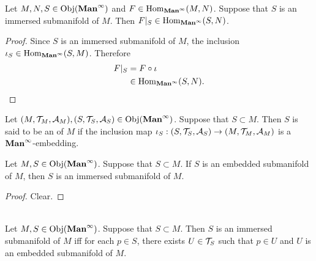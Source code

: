 \documentclass{book}
\begin{document}
\begin{ex} 
	Let $M, N, S \in \operatorname{Obj}(\operatorname*{\text{\textbf{Man}}^{\infty}})$ and $F \in \operatorname{Hom}_{\operatorname*{\text{\textbf{Man}}^{\infty}}}(M, N)$. Suppose that $S$ is an immersed submanifold of $M$. Then $F|_S \in \operatorname{Hom}_{\operatorname*{\text{\textbf{Man}}^{\infty}}}(S, N)$.   
\end{ex}

\begin{proof} 
	Since $S$ is an immersed submanifold of $M$, the inclusion $\iota_S \in \operatorname{Hom}_{\operatorname*{\text{\textbf{Man}}^{\infty}}}(S, M)$. Therefore
	\begin{align*}
		F|_S
		& = F \circ \iota \\
		& \in \operatorname{Hom}_{\operatorname*{\text{\textbf{Man}}^{\infty}}}(S, N).
	\end{align*}
\end{proof}

	\begin{defn} 
		Let $(M, \mathcal{T}_M, \mathcal{A}_M), (S, \mathcal{T}_S, \mathcal{A}_S) \in \operatorname{Obj}(\operatorname*{\text{\textbf{Man}}^{\infty}})$. Suppose that $S \subset M$. Then $S$ is said to be an  of $M$ if the inclusion map $\iota_S:(S, \mathcal{T}_S, \mathcal{A}_S) \rightarrow (M, \mathcal{T}_M, \mathcal{A}_M)$ is a $\operatorname*{\text{\textbf{Man}}^{\infty}}$-embedding.
	\end{defn}

	\begin{ex} 
		Let $M, S \in \operatorname{Obj}(\operatorname*{\text{\textbf{Man}}^{\infty}})$. Suppose that $S \subset M$. If $S$ is an embedded submanifold of $M$, then $S$ is an immersed submanifold of $M$.
	\end{ex}

	\begin{proof}
		Clear.
	\end{proof}

	\begin{ex}   \\
		Let $M, S \in \operatorname{Obj}(\operatorname*{\text{\textbf{Man}}^{\infty}})$. Suppose that $S \subset M$. Then $S$ is an immersed submanifold of $M$ iff for each $p \in S$, there exists $U \in \mathcal{T}_S$ such that $p \in U$ and $U$ is an embedded submanifold of $M$.
	\end{ex}
\end{document}
